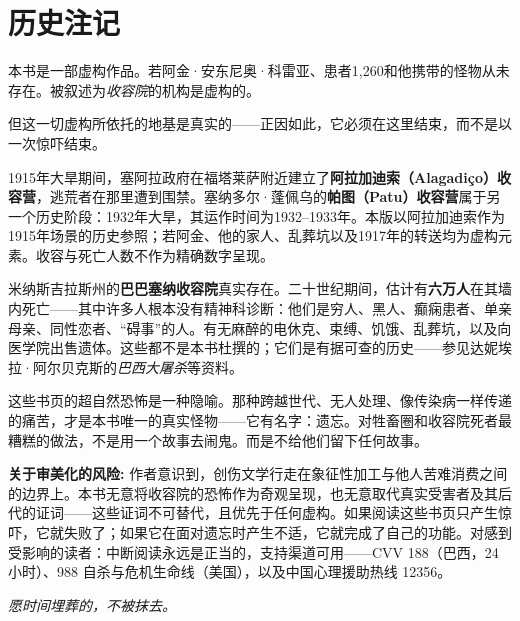 \cleardoublepage
\chapter*{历史注记}
\label{nota-historica}

\thispagestyle{empty}

\noindent 本书是一部虚构作品。若阿金·安东尼奥·科雷亚、患者1,260和他携带的怪物从未存在。被叙述为\textit{收容院}的机构是虚构的。

\vspace{0.8em}

\noindent 但这一切虚构所依托的地基是真实的——正因如此，它必须在这里结束，而不是以一次惊吓结束。

\vspace{0.8em}

\noindent 1915年大旱期间，塞阿拉政府在福塔莱萨附近建立了\textbf{阿拉加迪索（Alagadiço）收容营}，逃荒者在那里遭到围禁。塞纳多尔·蓬佩乌的\textbf{帕图（Patu）收容营}属于另一个历史阶段：1932年大旱，其运作时间为1932--1933年。本版以阿拉加迪索作为1915年场景的历史参照；若阿金、他的家人、乱葬坑以及1917年的转送均为虚构元素。收容与死亡人数不作为精确数字呈现。

\vspace{0.8em}

\noindent 米纳斯吉拉斯州的\textbf{巴巴塞纳收容院}真实存在。二十世纪期间，估计有\textbf{六万人}在其墙内死亡——其中许多人根本没有精神科诊断：他们是穷人、黑人、癫痫患者、单亲母亲、同性恋者、“碍事”的人。有无麻醉的电休克、束缚、饥饿、乱葬坑，以及向医学院出售遗体。这些都不是本书杜撰的；它们是有据可查的历史——参见达妮埃拉·阿尔贝克斯的\textit{巴西大屠杀}等资料。

\vspace{0.8em}

\noindent 这些书页的超自然恐怖是一种隐喻。那种跨越世代、无人处理、像传染病一样传递的痛苦，才是本书唯一的真实怪物——它有名字：遗忘。对牲畜圈和收容院死者最糟糕的做法，不是用一个故事去闹鬼。而是不给他们留下任何故事。

\vspace{0.8em}

\noindent \textbf{关于审美化的风险:} 作者意识到，创伤文学行走在象征性加工与他人苦难消费之间的边界上。本书无意将收容院的恐怖作为奇观呈现，也无意取代真实受害者及其后代的证词——这些证词不可替代，且优先于任何虚构。如果阅读这些书页只产生惊吓，它就失败了；如果它在面对遗忘时产生不适，它就完成了自己的功能。对感到受影响的读者：中断阅读永远是正当的，支持渠道可用——CVV 188（巴西，24小时）、988 自杀与危机生命线（美国），以及中国心理援助热线 12356。

\vspace{1.2em}

\noindent\hfill\textit{愿时间埋葬的，不被抹去。}\hspace{2em}
